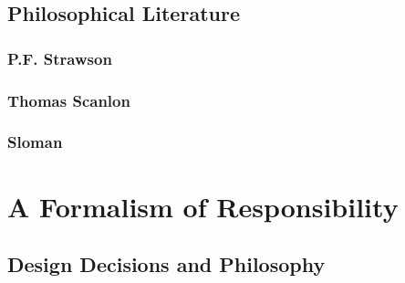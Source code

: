 \subsection{Philosophical Literature}  %

\subsubsection{P.F. Strawson}  %

\subsubsection{Thomas Scanlon}  %

\subsubsection{Sloman}  %



\section{A Formalism of Responsibility}

\subsection{Design Decisions and Philosophy}




